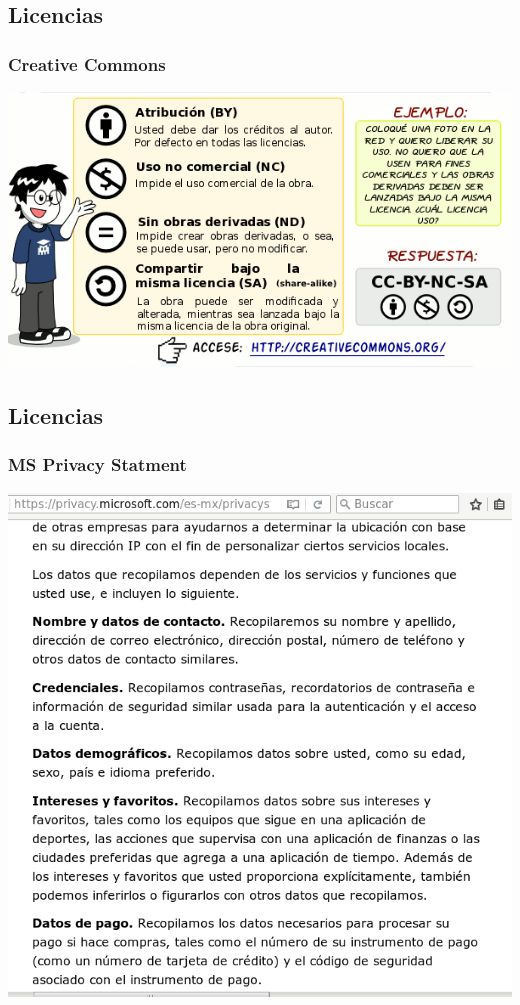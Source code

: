 \subsection{Licencias}
\begin{frame}
    \frametitle{Creative Commons}
        \includegraphics[width=\textwidth]{CC.png}
\end{frame}

\subsection{Licencias}
\begin{frame}
    \frametitle{MS Privacy Statment}
        \includegraphics[width=\textwidth]{MS_Privacy_Statment.png}
\end{frame}

